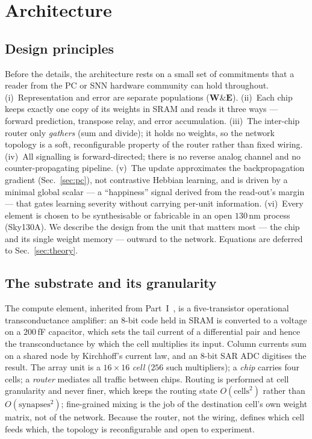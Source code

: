 \documentclass[11pt]{article}
\newcommand{\W}{\bm W}
\newcommand{\E}{\bm E}
\begin{document}
\section{Architecture}\label{sec:arch}

\subsection{Design principles}

Before the details, the architecture rests on a small set of commitments that a reader from the
PC or SNN hardware community can hold throughout. (i)~Representation and error are separate
populations ($\W\&\E$). (ii)~Each chip keeps exactly one copy of its weights in SRAM and reads it
three ways --- forward prediction, transpose relay, and error accumulation. (iii)~The inter-chip
router only \emph{gathers} (sum and divide); it holds no weights, so the network topology is a soft,
reconfigurable property of the router rather than fixed wiring. (iv)~All signalling is
forward-directed; there is no reverse analog channel and no counter-propagating pipeline. (v)~The
update approximates the backpropagation gradient (Sec.~\ref{sec:pc}), not contrastive Hebbian
learning, and is driven by a minimal global scalar --- a ``happiness'' signal derived from the
read-out's margin --- that gates learning severity without carrying per-unit information. (vi)~Every
element is chosen to be synthesisable or fabricable in an open $130$\,nm process (Sky130A). We
describe the design from the unit that matters most --- the chip and its single weight memory ---
outward to the network. Equations are deferred to Sec.~\ref{sec:theory}.

\subsection{The substrate and its granularity}

The compute element, inherited from Part~I~\cite{dobney2026analog}, is a five-transistor operational
transconductance amplifier: an 8-bit code held in SRAM is converted to a voltage on a $200$\,fF
capacitor, which sets the tail current of a differential pair and hence the transconductance by
which the cell multiplies its input. Column currents sum on a shared node by Kirchhoff's current
law, and an 8-bit SAR ADC digitises the result. The array unit is a $16\times16$ \emph{cell} ($256$
such multipliers); a \emph{chip} carries four cells; a \emph{router} mediates all traffic between
chips. Routing is performed at cell granularity and never finer, which keeps the routing state
$O(\text{cells}^2)$ rather than $O(\text{synapses}^2)$; fine-grained mixing is the job of the
destination cell's own weight matrix, not of the network. Because the router, not the wiring, defines
which cell feeds which, the topology is reconfigurable and open to experiment.
\end{document}
